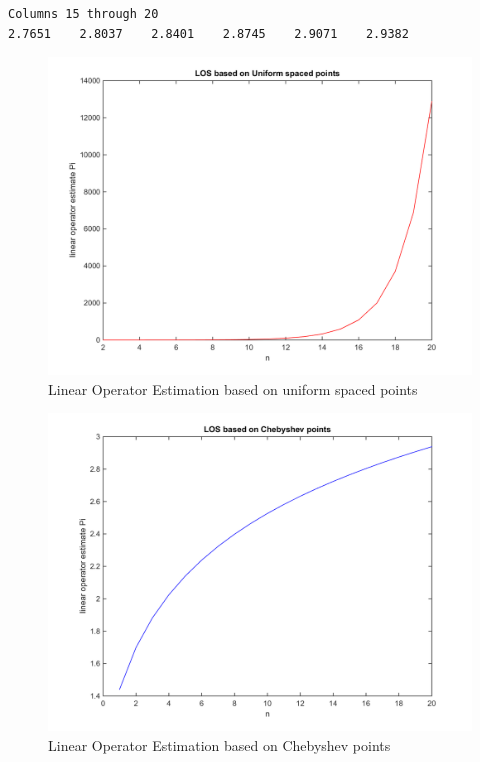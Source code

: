\documentclass[14pt,a4paper]{article}
\begin{document}
\begin{enumerate}
\begin{lstlisting}
Columns 15 through 20
2.7651    2.8037    2.8401    2.8745    2.9071    2.9382
	\end{lstlisting}
	\begin{figure}[htp]
		\begin{center}
			\includegraphics[scale=0.7]{LOS_uniform.png}
			\caption{Linear Operator Estimation based on uniform spaced points}
		\end{center}
	\end{figure}
	\pagebreak
	\begin{figure}[htp]
		\begin{center}
			\includegraphics[scale=0.7]{LOS_Chebyshev.png}
			\caption{Linear Operator Estimation based on Chebyshev points}
		\end{center}
	\end{figure}
\end{enumerate}
\end{document}
